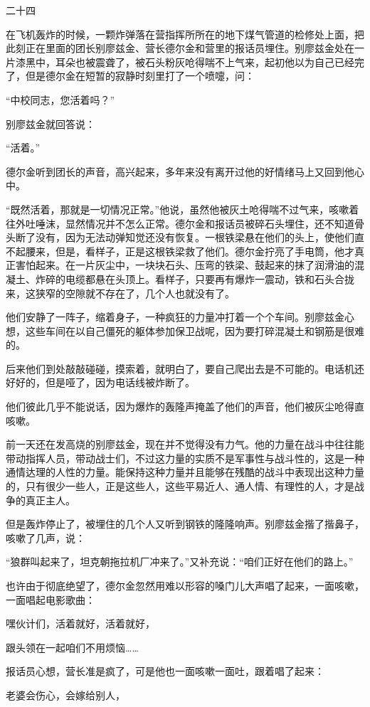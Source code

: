 二十四

在飞机轰炸的时候，一颗炸弹落在营指挥所所在的地下煤气管道的检修处上面，把此刻正在里面的团长别廖兹金、营长德尔金和营里的报话员埋住。别廖兹金处在一片漆黑中，耳朵也被震聋了，被石头粉灰呛得喘不上气来，起初他以为自己已经完了，但是德尔金在短暂的寂静时刻里打了一个喷嚏，问：

“中校同志，您活着吗？”

别廖兹金就回答说：

“活着。”

德尔金听到团长的声音，高兴起来，多年来没有离开过他的好情绪马上又回到他心中。

“既然活着，那就是一切情况正常。”他说，虽然他被灰土呛得喘不过气来，咳嗽着往外吐唾沫，显然情况并不怎么正常。德尔金和报话员被碎石头埋住，还不知道骨头断了没有，因为无法动弹知觉还没有恢复。一根铁梁悬在他们的头上，使他们直不起腰来，但是，看样子，正是这根铁梁救了他们。德尔金拧亮了手电筒，他才真正害怕起来。在一片灰尘中，一块块石头、压弯的铁梁、鼓起来的抹了润滑油的混凝土、炸碎的电缆都悬在头顶上。看样子，只要再有爆炸一震动，铁和石头合拢来，这狭窄的空隙就不存在了，几个人也就没有了。

他们安静了一阵子，缩着身子，一种疯狂的力量冲打着一个个车间。别廖兹金心想，这些车间在以自己僵死的躯体参加保卫战呢，因为要打碎混凝土和钢筋是很难的。

后来他们到处敲敲碰碰，摸索着，就明白了，要自己爬出去是不可能的。电话机还好好的，但是哑了，因为电话线被炸断了。

他们彼此几乎不能说话，因为爆炸的轰隆声掩盖了他们的声音，他们被灰尘呛得直咳嗽。

前一天还在发高烧的别廖兹金，现在并不觉得没有力气。他的力量在战斗中往往能带动指挥人员，带动战士们，不过这力量的实质不是军事性与战斗性的，这是一种通情达理的人性的力量。能保持这种力量并且能够在残酷的战斗中表现出这种力量的，只有很少一些人，正是这些人，这些平易近人、通人情、有理性的人，才是战争的真正主人。

但是轰炸停止了，被埋住的几个人又听到钢铁的隆隆响声。别廖兹金揩了揩鼻子，咳嗽了几声，说：

“狼群叫起来了，坦克朝拖拉机厂冲来了。”又补充说：“咱们正好在他们的路上。”

也许由于彻底绝望了，德尔金忽然用难以形容的嗓门儿大声唱了起来，一面咳嗽，一面唱起电影歌曲：

嘿伙计们，活着就好，活着就好，

跟头领在一起咱们不用烦恼……

报话员心想，营长准是疯了，可是他也一面咳嗽一面吐，跟着唱了起来：

老婆会伤心，会嫁给别人，

